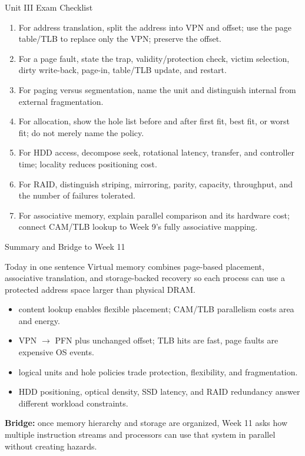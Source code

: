 \documentclass[aspectratio=169]{beamer}
\begin{document}
\begin{frame}{Unit III Exam Checklist}
  \footnotesize
  \begin{enumerate}
    \item For address translation, split the address into VPN and offset; use
      the page table/TLB to replace only the VPN; preserve the offset.
    \item For a page fault, state the trap, validity/protection check, victim
      selection, dirty write-back, page-in, table/TLB update, and restart.
    \item For paging versus segmentation, name the unit and distinguish
      internal from external fragmentation.
    \item For allocation, show the hole list before and after first fit, best
      fit, or worst fit; do not merely name the policy.
    \item For HDD access, decompose seek, rotational latency, transfer, and
      controller time; locality reduces positioning cost.
    \item For RAID, distinguish striping, mirroring, parity, capacity,
      throughput, and the number of failures tolerated.
    \item For associative memory, explain parallel comparison and its hardware
      cost; connect CAM/TLB lookup to Week 9's fully associative mapping.
  \end{enumerate}
\end{frame}

\begin{frame}[shrink=5]{Summary and Bridge to Week 11}
  \begin{exampleblock}{Today in one sentence}
    Virtual memory combines page-based placement, associative translation, and
    storage-backed recovery so each process can use a protected address space
    larger than physical DRAM.
  \end{exampleblock}
  \begin{itemize}
    \item {} content lookup enables flexible placement;
      CAM/TLB parallelism costs area and energy.
    \item {} VPN $\to$ PFN plus unchanged offset; TLB hits are fast,
      page faults are expensive OS events.
    \item {} logical units and hole policies trade
      protection, flexibility, and fragmentation.
    \item {} HDD positioning, optical density, SSD latency, and RAID
      redundancy answer different workload constraints.
  \end{itemize}
  \vspace{0.1cm}
  \textbf{Bridge:} once memory hierarchy and storage are organized, Week 11
  asks how multiple instruction streams and processors can use that system in
  parallel without creating hazards.
\end{frame}
\end{document}
